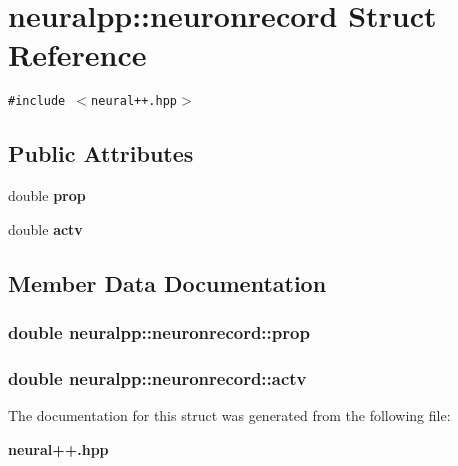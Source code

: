 \section{neuralpp::neuronrecord Struct Reference}
\label{structneuralpp_1_1neuronrecord}
{\tt \#include $<$neural++.hpp$>$}

\subsection*{Public Attributes}
\begin{CompactItemize}
\item 
double {\bf prop}
\item 
double {\bf actv}
\end{CompactItemize}


\subsection{Member Data Documentation}
\subsubsection[prop]{\setlength{\rightskip}{0pt plus 5cm}double {\bf neuralpp::neuronrecord::prop}}\label{structneuralpp_1_1neuronrecord_30b298a95939b88b565fefc2dc57e89d}


\subsubsection[actv]{\setlength{\rightskip}{0pt plus 5cm}double {\bf neuralpp::neuronrecord::actv}}\label{structneuralpp_1_1neuronrecord_15201b190584987255d81d4b7e773375}




The documentation for this struct was generated from the following file:\begin{CompactItemize}
\item 
{\bf neural++.hpp}\end{CompactItemize}
